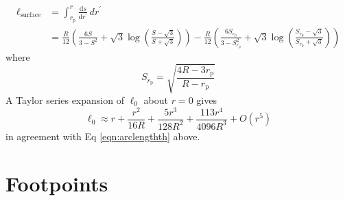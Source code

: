 \documentclass{book}
\newcommand{\deriv}[2]{\frac{\text{d}{#1}}{\text{d}{#2}}}
\newcommand{\rp}{r_\text{p}} %
\begin{document}
\begin{equation}
    \begin{aligned}
        \ell_\text{surface} &= \int_{\rp}^r \deriv{s}{r^\prime} \,dr^\prime \\
               &= \frac{R}{12}\left(\frac{6S}{3 - S^2} + \sqrt{3}\log\left(\frac{S - \sqrt{3}}{S + \sqrt{3}}\right)\right) -
                  \frac{R}{12}\left(\frac{6S_{\rp}}{3 - S_{\rp}^2} + \sqrt{3}\log\left(\frac{S_{\rp} -
                  \sqrt{3}}{S_{\rp} + \sqrt{3}}\right)\right)
     \end{aligned}
\end{equation}
where
\begin{equation}
    S_{\rp} = \sqrt{\frac{4R-3\rp}{R-\rp}}
\end{equation}
A Taylor series expansion of $\ell_0$ about $r=0$ gives
\begin{equation}
    \ell_0 \approx r + \frac{r^2}{16R} + \frac{5r^3}{128R^2} + \frac{113r^4}{4096R^3} + O(r^5)
\end{equation}
in agreement with Eq \eqref{eqn:arclengthth} above.

\section{Footpoints}
\label{sec:footpoints}
\end{document}

